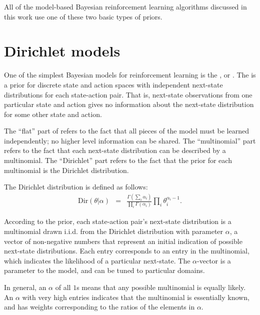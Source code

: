 All of the model-based Bayesian reinforcement learning algorithms discussed in this work use one of these two basic types of priors.


\section{Dirichlet models}
\label{sec:models:fdm}

One of the simplest Bayesian models for reinforcement learning is the , or . The  is a prior for discrete state and action spaces with independent next-state distributions for each state-action pair. That is, next-state observations from one particular state and action gives no information about the next-state distribution for some other state and action.

The ``flat'' part of  refers to the fact that all pieces of the model must be learned independently; no higher level information can be shared. The ``multinomial'' part refers to the fact that each next-state distribution can be described by a multinomial. The ``Dirichlet'' part refers to the fact that the prior for each multinomial is the Dirichlet distribution.

The Dirichlet distribution is defined as follows:
\begin{eqnarray}
\mbox{Dir}(\theta|\alpha) &=& \frac{\Gamma\left(\sum_i \alpha_i\right)}{\prod_i \Gamma(\alpha_i)} \prod_i \theta_i^{\alpha_i-1}.
\end{eqnarray}

According to the  prior, each state-action pair's next-state distribution is a multinomial drawn i.i.d. from the Dirichlet distribution with parameter $\alpha$, a vector of non-negative numbers that represent an initial indication of possible next-state distributions. Each entry corresponds to an entry in the multinomial, which indicates the likelihood of a particular next-state. The $\alpha$-vector is a parameter to the model, and can be tuned to particular domains.

In general, an $\alpha$ of all $1$s means that any possible multinomial is equally likely. An $\alpha$ with very high entries indicates that the multinomial is essentially known, and has weights corresponding to the ratios of the elements in $\alpha$.

